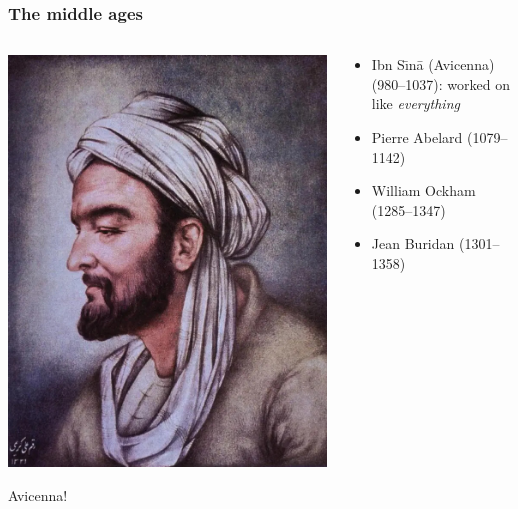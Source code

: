 \begin{frame}
  \frametitle{The middle ages}
  \begin{columns}
    \begin{column}{.5\textwidth}
    \includegraphics[height=.8\textheight]{../assets/avicenna}
    
    Avicenna! 
    \end{column}
    \begin{column}{.5\textwidth}
      \begin{itemize}[<+->]
        \item Ibn S\=\i n\=a (Avicenna) (980--1037): worked on like \textit{everything} 
        \item Pierre Abelard (1079--1142)
        \item William Ockham (1285--1347)
        \item Jean Buridan (1301--1358)
      \end{itemize}
    \end{column}
  \end{columns}
\end{frame}

